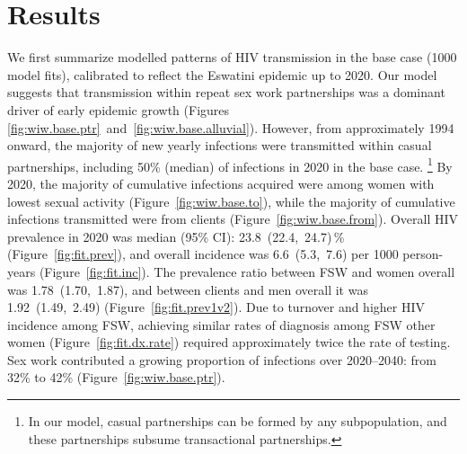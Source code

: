 \section{Results}\label{art.res}
We first summarize modelled patterns of HIV transmission in the base case (1000 model fits),
calibrated to reflect the Eswatini epidemic up to 2020.
Our model suggests that transmission within repeat sex work partnerships
was a dominant driver of early epidemic growth
(Figures \ref{fig:wiw.base.ptr}~and~\ref{fig:wiw.base.alluvial}).
However, from approximately 1994 onward,
the majority of new yearly infections were transmitted within casual partnerships, %
including 50\% (median) of infections in 2020 in the base case.%
\footnote{In our model, casual partnerships can be formed by any subpopulation,
  and these partnerships subsume transactional partnerships.}
By 2020, the majority of cumulative infections acquired
were among women with lowest sexual activity (Figure~\ref{fig:wiw.base.to}),
while the majority of cumulative infections transmitted
were from clients (Figure~\ref{fig:wiw.base.from}).
Overall HIV prevalence in 2020 was median (95\% CI):
23.8~(22.4,~24.7)\,\% (Figure~\ref{fig:fit.prev}), %
and overall incidence was 6.6~(5.3,~7.6) per 1000 person-years (Figure~\ref{fig:fit.inc}).
The prevalence ratio between FSW and women overall was 1.78~(1.70,~1.87), %
and between clients and men overall it was 1.92~(1.49,~2.49) %
(Figure~\ref{fig:fit.prev1v2}).
Due to turnover and higher HIV incidence among FSW,
achieving similar rates of diagnosis among FSW \vs other women (Figure~\ref{fig:fit.dx.rate})
required approximately twice the rate of testing. %
Sex work contributed a growing proportion of infections
over 2020--2040: from 32\% to 42\% (Figure~\ref{fig:wiw.base.ptr}). %
